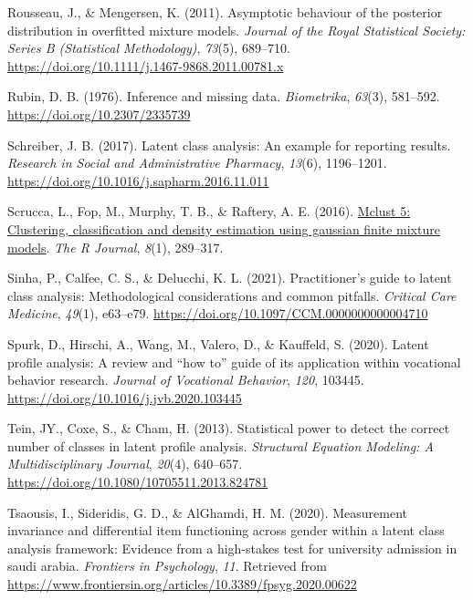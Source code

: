 \documentclass[
  ,man,floatsintext]{apa6}
\newlength{\cslhangindent}
\newlength{\cslentryspacingunit} %
\newenvironment{CSLReferences}[2] %
 {%
  \setlength{\parindent}{0pt}
  \ifodd #1
  \let\oldpar\par
  \def\par{\hangindent=\cslhangindent\oldpar}
  \fi
  \setlength{\parskip}{#2\cslentryspacingunit}
 }%
 {}
\begin{document}
\begin{CSLReferences}{1}{0}
\leavevmode{}%
Rousseau, J., \& Mengersen, K. (2011). Asymptotic behaviour of the posterior distribution in overfitted mixture models. \emph{Journal of the Royal Statistical Society: Series B (Statistical Methodology)}, \emph{73}(5), 689--710. \url{https://doi.org/10.1111/j.1467-9868.2011.00781.x}

\leavevmode{}%
Rubin, D. B. (1976). Inference and missing data. \emph{Biometrika}, \emph{63}(3), 581--592. \url{https://doi.org/10.2307/2335739}

\leavevmode{}%
Schreiber, J. B. (2017). Latent class analysis: An example for reporting results. \emph{Research in Social and Administrative Pharmacy}, \emph{13}(6), 1196--1201. \url{https://doi.org/10.1016/j.sapharm.2016.11.011}

\leavevmode{}%
Scrucca, L., Fop, M., Murphy, T. B., \& Raftery, A. E. (2016). \href{https://www.ncbi.nlm.nih.gov/pmc/articles/PMC5096736}{Mclust 5: Clustering, classification and density estimation using gaussian finite mixture models}. \emph{The R Journal}, \emph{8}(1), 289--317.

\leavevmode{}%
Sinha, P., Calfee, C. S., \& Delucchi, K. L. (2021). Practitioner's guide to latent class analysis: Methodological considerations and common pitfalls. \emph{Critical Care Medicine}, \emph{49}(1), e63--e79. \url{https://doi.org/10.1097/CCM.0000000000004710}

\leavevmode{}%
Spurk, D., Hirschi, A., Wang, M., Valero, D., \& Kauffeld, S. (2020). Latent profile analysis: A review and {``how to''} guide of its application within vocational behavior research. \emph{Journal of Vocational Behavior}, \emph{120}, 103445. \url{https://doi.org/10.1016/j.jvb.2020.103445}

\leavevmode{}%
Tein, JY., Coxe, S., \& Cham, H. (2013). Statistical power to detect the correct number of classes in latent profile analysis. \emph{Structural Equation Modeling: A Multidisciplinary Journal}, \emph{20}(4), 640--657. \url{https://doi.org/10.1080/10705511.2013.824781}

\leavevmode{}%
Tsaousis, I., Sideridis, G. D., \& AlGhamdi, H. M. (2020). Measurement invariance and differential item functioning across gender within a latent class analysis framework: Evidence from a high-stakes test for university admission in saudi arabia. \emph{Frontiers in Psychology}, \emph{11}. Retrieved from \url{https://www.frontiersin.org/articles/10.3389/fpsyg.2020.00622}


\end{CSLReferences}
\end{document}
